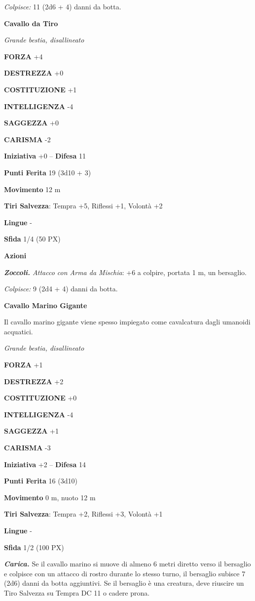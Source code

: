\begin{multicols}{2}
	\textit{Colpisce:} 11 (2d6 + 4) danni da botta.

	\medskip\textbf{Cavallo da Tiro}

	\textit{Grande bestia, disallineato}

	\textbf{FORZA} +4

	\textbf{DESTREZZA} +0

	\textbf{COSTITUZIONE} +1

	\textbf{INTELLIGENZA} -4

	\textbf{SAGGEZZA} +0

	\textbf{CARISMA} -2

	\textbf{Iniziativa} +0 -- \textbf{Difesa} 11

	\textbf{Punti Ferita} 19 (3d10 + 3)

	\textbf{Movimento} 12 m

	\textbf{Tiri Salvezza}: Tempra +5, Riflessi +1, Volontà +2

	\textbf{Lingue} -

	\textbf{Sfida} 1/4 (50 PX)

	\textbf{Azioni}

	\textit{\textbf{Zoccoli.} Attacco con Arma da Mischia}: +6 a colpire, portata 1 m, un bersaglio.

	\textit{Colpisce:} 9 (2d4 + 4) danni da botta.

	\medskip\textbf{Cavallo Marino Gigante}

	Il cavallo marino gigante viene spesso impiegato come cavalcatura dagli umanoidi acquatici.

	\textit{Grande bestia, disallineato}

	\textbf{FORZA} +1

	\textbf{DESTREZZA} +2

	\textbf{COSTITUZIONE} +0

	\textbf{INTELLIGENZA} -4

	\textbf{SAGGEZZA} +1

	\textbf{CARISMA} -3

	\textbf{Iniziativa} +2 -- \textbf{Difesa} 14

	\textbf{Punti Ferita} 16 (3d10)

	\textbf{Movimento} 0 m, nuoto 12 m

	\textbf{Tiri Salvezza}: Tempra +2, Riflessi +3, Volontà +1

	\textbf{Lingue} -

	\textbf{Sfida} 1/2 (100 PX)

	\textit{\textbf{Carica.}} Se il cavallo marino si muove di almeno 6 metri diretto verso il bersaglio e colpisce con un attacco di rostro durante lo stesso turno, il bersaglio subisce 7 (2d6) danni da botta aggiuntivi. Se il bersaglio è una creatura, deve riuscire un Tiro Salvezza su Tempra DC 11 o cadere prona.


\end{multicols}
